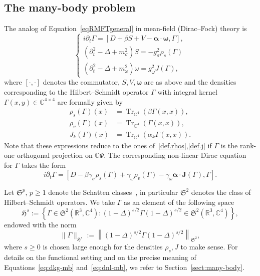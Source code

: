 \documentclass[AHL,Unicode,longabstracts,published]{cedram}
\DeclareMathOperator{\Tr}{Tr}
\newcommand\R{\mathbb{R}}
\newcommand\C{\mathbb{C}}
\newcommand{\gS}{\mathfrak{S}}
\newcommand{\gH}{\mathfrak{H}}
\begin{document}
\subsection{The many-body problem}


The analog of Equation~\eqref{eqRMFTgeneral} in mean-field (Dirac--Fock) theory is
\begin{equation}\label{eq:dkg-mb}
\begin{cases}
i\partial_t\Gamma = [D+{ \beta}S + V - {\bm \alpha}\cdot {\bm \omega},\Gamma],\\
\left(\partial^2_t-\Delta+m_\sigma^2\right)S=-g_\sigma^2\rho_s(\Gamma)\\
\left(\partial^2_t-\Delta+m_\omega^2\right)\omega=g_\omega^2 J(\Gamma),
\end{cases}
\end{equation}
where $[\cdot, \cdot]$ denotes the commutator, $S, V, {\bm \omega}$ are as above and the densities corresponding to the Hilbert--Schmidt operator $\Gamma$ with integral kernel $\Gamma(x,y)\in \C^{4\times 4}$ are formally given by
\begin{align}
\rho_s(\Gamma)(x)&= \Tr_{\C^4}(\beta \Gamma(x,x)), \label{eq:rho-s-def}
\\
\rho_v(\Gamma)(x)&= \Tr_{\C^4}(\Gamma(x,x)), \label{eq:rho-v-def}
\\
J_k(\Gamma)(x)&=\Tr_{\C^4}(\alpha_k\Gamma(x,x)). \label{eq:rho-J-def}
\end{align}
Note that these expressions reduce to the ones of~\eqref{def.rhos},\eqref{def.j} if $\Gamma$ is the rank-one orthogonal projection on $\C\Psi$. The corresponding non-linear Dirac equation for $\Gamma$ takes the form
\begin{equation}\label{eq:dnl-mb}
i\partial_t\Gamma = \left[D - { \beta}\gamma_\sigma \rho_s(\Gamma) + \gamma_\omega \rho_v(\Gamma) - \gamma_\omega {\bm \alpha}\cdot {\bm J}(\Gamma), \Gamma \right].
\end{equation}


Let $\gS^p$, $p\geq 1$ denote the Schatten classes~\cite{simontrace}, in particular $\gS^2$ denotes the class of Hilbert--Schmidt operators. We take $\Gamma$ as an element of the following space
\begin{equation}\label{eq:H^s-op}
\gH^s:=\left\{\Gamma \in \gS^2\left(\R^3, \C^4\right): (1-\Delta)^{s/2}\Gamma(1-\Delta)^{s/2} \in \gS^2\left(\R^3, \C^4\right)\right\},
\end{equation}
endowed with the norm
\begin{equation}\label{eq:norm-H^s-op}
\|\Gamma\|_{\gH^s} := \left\| (1-\Delta)^{s/2}\Gamma(1-\Delta)^{s/2} \right\|_{\gS^2},
\end{equation}
where $s\geq 0$ is chosen large enough for the densities $\rho_s, J$ to make sense. For details on the functional setting and on the precise meaning of Equations~\eqref{eq:dkg-mb} and~\eqref{eq:dnl-mb}, we refer to Section~\ref{sect:many-body}.
\end{document}
